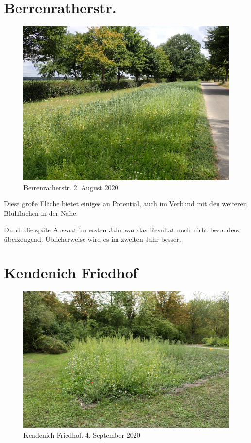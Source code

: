 \documentclass[11pt]{article}
\begin{document}
\section{Berrenratherstr.}
\begin{figure}[h!]
  \includegraphics[width=\linewidth]{img/berrenrather/august.jpg}
  \caption{Berrenratherstr. 2. August 2020}
\end{figure}

Diese große Fläche bietet einiges an Potential, auch im Verbund mit den weiteren Blühflächen in der Nähe.

Durch die späte Aussaat im ersten Jahr war das Resultat noch nicht besonders überzeugend. Üblicherweise wird es im zweiten Jahr besser.

\clearpage
\section{Kendenich Friedhof}
\begin{figure}[h!]
  \includegraphics[width=\linewidth]{img/kendenich/september.jpg}
  \caption{Kendenich Friedhof. 4. September 2020}
\end{figure}
\end{document}
